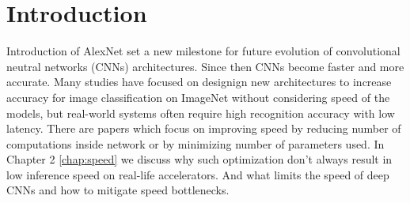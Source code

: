 

\chapter{Introduction}







Introduction of  AlexNet \cite{krizhevsky2012_imagenet_alexnet} set a new milestone for future evolution of convolutional neutral networks (CNNs) architectures. Since then CNNs become faster and more accurate. Many studies have focused on designign new architectures to increase accuracy for image classification on ImageNet without considering speed of the models, but real-world systems often require high recognition accuracy with low latency. There are papers which focus on improving speed by reducing number of computations inside network or by minimizing number of parameters used. In Chapter 2 \ref{chap:speed} we discuss why such optimization don't always result in low inference speed on real-life accelerators. And what limits the speed of deep CNNs and how to mitigate speed bottlenecks.

